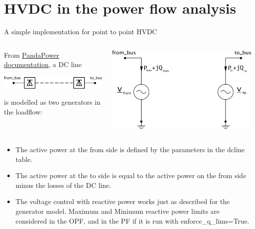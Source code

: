 \section{HVDC in the power flow analysis}

\begin{frame}[allowframebreaks]{A simple implementation for point to point HVDC}

\begin{columns}
\begin{column}{0.5\linewidth}
From \href{https://pandapower.readthedocs.io/en/latest/elements/dcline.html}{PandaPower \cite{thurner2018pandapower} documentation}, 
a DC line
\begin{center}
\includegraphics[width=1.0\linewidth]{images/dcline1.png}
\end{center}
is modelled as two generators in the loadflow:
\end{column}
\begin{column}{0.5\linewidth}
\begin{center}
    \includegraphics[width=1.0\linewidth]{images/dcline2.png}
\end{center}
\end{column}
\end{columns}

\newpage
\begin{itemize}
    \item The active power at the from side is defined by the parameters in the dcline table.
    \item The active power at the to side is equal to the active power on the from side minus the losses of the DC line.
    \item The voltage control with reactive power works just as described for the generator model. Maximum and Minimum reactive power limits are considered in the OPF, and in the PF if it is run with enforce\_q\_lims=True.
\end{itemize}

\end{frame}


\nocite{mohan2012electric, vancutsemELEC0445}


